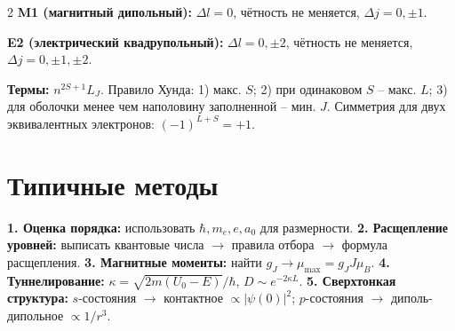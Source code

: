 \documentclass[10pt,a4paper]{article}
\begin{document}
\begin{multicols}{2}
\textbf{M1 (магнитный дипольный):}
$\Delta l = 0$, чётность не меняется, $\Delta j = 0,\pm1$.

\textbf{E2 (электрический квадрупольный):}
$\Delta l = 0,\pm2$, чётность не меняется, $\Delta j = 0,\pm1,\pm2$.

\textbf{Термы:} $n^{2S+1}L_J$.
Правило Хунда: 1) макс. $S$; 2) при одинаковом $S$ -- макс. $L$; 3) для оболочки менее чем наполовину заполненной -- мин. $J$.
Симметрия для двух эквивалентных электронов: $(-1)^{L+S} = +1$.

\section{Типичные методы}

\textbf{1. Оценка порядка:} использовать $\hbar, m_e, e, a_0$ для размерности.
\textbf{2. Расщепление уровней:} выписать квантовые числа $\to$ правила отбора $\to$ формула расщепления.
\textbf{3. Магнитные моменты:} найти $g_J \to \mu_{\max} = g_J J \mu_B$.
\textbf{4. Туннелирование:} $\kappa = \sqrt{2m(U_0-E)}/\hbar$, $D \sim e^{-2\kappa L}$.
\textbf{5. Сверхтонкая структура:} $s$-состояния $\to$ контактное $\propto |\psi(0)|^2$; $p$-состояния $\to$ диполь-дипольное $\propto 1/r^3$.

\end{multicols}
\end{document}
